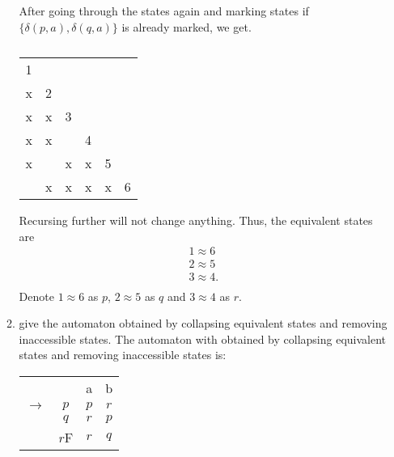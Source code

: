 \documentclass{article}
\newcommand{\setst}{\hspace{1mm} | \hspace{1mm} }
\renewcommand{\epsilon}{\varepsilon}
\theoremstyle{definition}
\begin{document}
\begin{enumerate}
\begin{enumerate}
	After going through the states again and marking states if $\{\delta(p,a),\delta(q,a)\}$ is already marked, we get.
	\begin{table}[H]
		\centering
		\caption{}
		\label{my-label2}
		\begin{tabular}{llllll}
			1 &   &   &   &   &   \\
			x & 2 &   &   &   &   \\
			x & x & 3 &   &   &   \\
			x & x &   & 4 &   &   \\
			x &   & x & x & 5 &   \\
			& x & x & x & x & 6
		\end{tabular}
	\end{table}
Recursing further will not change anything. Thus, the equivalent states are
\begin{gather*}
1 \approx 6 \\
2 \approx 5 \\
3 \approx 4. \\
\end{gather*}
Denote $1 \approx 6$ as $p$, $2 \approx 5$ as $q$ and $3 \approx 4$ as $r$. 
	\item give the automaton obtained by collapsing equivalent states and removing inaccessible states.
	The automaton with obtained by collapsing equivalent states and removing inaccessible states is:
	
		\begin{center}
			\begin{tabular}{cccc}
				& & a & b \\\cline{3-4}
				$\rightarrow$ & \multicolumn{1}{c|}{$p$} &$p$ & $r$\\
				& \multicolumn{1}{c|}{$q$} & $r$ & $p$\\
				& \multicolumn{1}{c|}{$r$F} & $r$ & $q$\\
			\end{tabular}
		\end{center}
\end{enumerate}
\end{enumerate}
\end{document}
